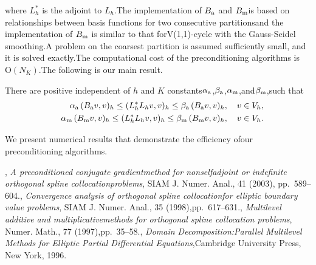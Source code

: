 \documentclass{report}
\begin{document}
where $L_h^*$ is the adjoint to $L_h$.The implementation of $B_{\textup{\scriptsize a}}$ and $B_{\textup{\scriptsize m}}$is based on relationships between basis functions for two consecutive partitionsand the implementation of $B_{\textup{\scriptsize m}}$ is similar to that forV(1,1)-cycle with the Gauss-Seidel smoothing.A problem on the coarsest partition is assumed sufficiently small,
and it is solved exactly.The computational cost of the preconditioning algorithms is $\mbox{O}(N_K)$.The following is our main result.\begin{theorem}There are positive independent of $h$ and $K$ constants$\alpha_{\textup{\scriptsize a}}$,$\beta_{\textup{\scriptsize a}}$,$\alpha_{\textup{\scriptsize m}}$,and$\beta_{\textup{\scriptsize m}}$,such that\begin{eqnarray}\label{eq:spectral_equiv}&&\alpha_{\textup{\scriptsize a}}\,
(B_{\textup{\scriptsize a}}v,v)_h\leq (L_h^*L_hv,v)_h \leq\beta_{\textup{\scriptsize a}}\,
(B_{\textup{\scriptsize a}}v,v)_h,\quad v\in V_h,\\\nonumber&&\alpha_{\textup{\scriptsize m}}\,
(B_{\textup{\scriptsize m}}v,v)_h\leq (L_h^*L_hv,v)_h \leq\beta_{\textup{\scriptsize m}}\,
(B_{\textup{\scriptsize m}}v,v)_h,\quad v\in V_h.\end{eqnarray}\end{theorem}We present numerical results that demonstrate the efficiency ofour preconditioning algorithms.\begin{thebibliography}{1},
{\em A preconditioned conjugate gradientmethod for nonselfadjoint or indefinite orthogonal spline collocationproblems},
SIAM J.
Numer.
Anal.,
41 (2003),
pp.~589--604.,
{\em Convergence analysis of orthogonal spline collocationfor elliptic boundary value problems},
SIAM J.
Numer.
Anal.,
35 (1998),pp.~617--631.,
{\em Multilevel additive and multiplicativemethods for orthogonal spline collocation problems},
Numer.
Math.,
77 (1997),pp.~35--58.,
{\em Domain Decomposition:Parallel Multilevel Methods for Elliptic Partial Differential Equations},Cambridge University Press,
New York,
1996.\end{thebibliography}
\end{document}
